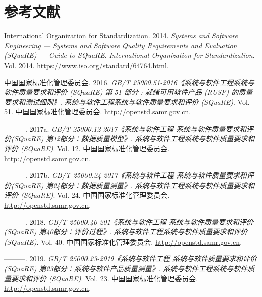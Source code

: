 \documentclass[hyperref, a4paper]{ctexart}
\begin{document}
\pagebreak

\hypertarget{ux53c2ux8003ux6587ux732e}{%
\section*{参考文献}\label{ux53c2ux8003ux6587ux732e}}

\hypertarget{refs}{}
\leavevmode\hypertarget{ref-innovativeInternationalisation}{}%
International Organization for Standardization. 2014. \emph{Systems and
Software Engineering --- Systems and Software Quality Requirements and
Evaluation (SQuaRE) --- Guide to SQuaRE}. \emph{International
Organization for Standardization}. Vol. 2014.
\url{https://www.iso.org/standard/64764.html}.

\leavevmode\hypertarget{ref-innovative1}{}%
中国国家标准化管理委员会. 2016. \emph{GB/T
25000.51-2016《系统与软件工程系统与软件质量要求和评价 (SQuaRE) 第 51
部分 : 就绪可用软件产品 (RUSP) 的质量要求和测试细则》}.
\emph{系统与软件工程系统与软件质量要求和评价 (SQuaRE)}. Vol. 51.
中国国家标准化管理委员会. \url{http://openstd.samr.gov.cn}.

\leavevmode\hypertarget{ref-innovative3}{}%
---------. 2017a. \emph{GB/T 25000.12-2017《系统与软件工程
系统与软件质量要求和评价(SQuaRE) 第12部分：数据质量模型》}.
\emph{系统与软件工程系统与软件质量要求和评价 (SQuaRE)}. Vol. 12.
中国国家标准化管理委员会. \url{http://openstd.samr.gov.cn}.

\leavevmode\hypertarget{ref-innovative4}{}%
---------. 2017b. \emph{GB/T 25000.24-2017《系统与软件工程
系统与软件质量要求和评价(SQuaRE) 第24部分：数据质量测量》}.
\emph{系统与软件工程系统与软件质量要求和评价 (SQuaRE)}. Vol. 24.
中国国家标准化管理委员会. \url{http://openstd.samr.gov.cn}.

\leavevmode\hypertarget{ref-innovative5}{}%
---------. 2018. \emph{GB/T 25000.40-201《系统与软件工程
系统与软件质量要求和评价(SQuaRE) 第40部分：评价过程》}.
\emph{系统与软件工程系统与软件质量要求和评价 (SQuaRE)}. Vol. 40.
中国国家标准化管理委员会. \url{http://openstd.samr.gov.cn}.

\leavevmode\hypertarget{ref-innovative2}{}%
---------. 2019. \emph{GB/T 25000.23-2019《系统与软件工程
系统与软件质量要求和评价(SQuaRE) 第23部分：系统与软件产品质量测量》}.
\emph{系统与软件工程系统与软件质量要求和评价 (SQuaRE)}. Vol. 23.
中国国家标准化管理委员会. \url{http://openstd.samr.gov.cn}.
\end{document}
